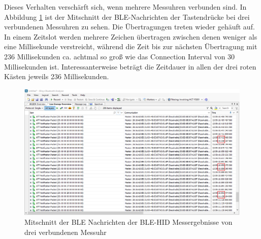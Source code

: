 Dieses Verhalten verschärft sich, wenn mehrere Messuhren verbunden sind. In Abbildung \ref{fig:MitschnittDreiMessuhr} ist der Mitschnitt der BLE-Nachrichten der Tastendrücke bei drei verbundenen Messuhren zu sehen. Die Übertragungen treten wieder gehäuft auf. In einem Zeitslot werden mehrere Zeichen übertragen zwischen denen weniger als eine Millisekunde verstreicht, während die Zeit bis zur nächsten Übertragung mit 236 Millisekunden ca. achtmal so groß wie das Connection Interval von 30 Millisekunden ist. Interessanterweise beträgt die Zeitdauer in allen der drei roten Kästen jeweils 236 Millisekunden.
\begin{figure}[H] 
	\centering
	\includegraphics[width=\textwidth]{figures/BLEHID2device.png}
	\caption{Mitschnitt der BLE Nachrichten der BLE-HID Messergebnisse von drei verbundenen Messuhr}
	\label{fig:MitschnittDreiMessuhr}
\end{figure}

